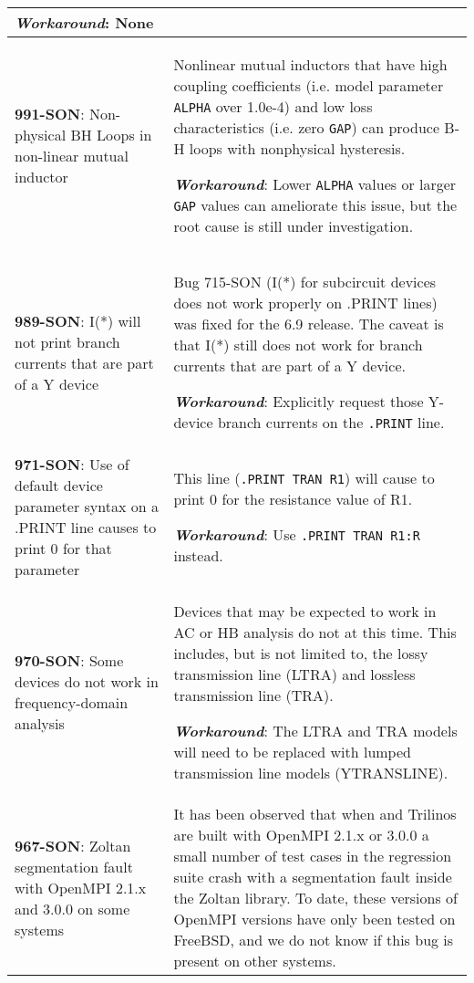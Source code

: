 {\begin{longtable}[h] {>{\raggedright\small}m{2in}|>{\raggedright\let\\\tabularnewline\small}m{3.5in}}
\textbf{\textit{Workaround}}: None
\\ \hline

\textbf{991-SON}: Non-physical BH Loops in non-linear mutual inductor &
Nonlinear mutual inductors that have high coupling coefficients (i.e. 
model parameter \texttt{ALPHA} over 1.0e-4) and low loss characteristics 
(i.e. zero \texttt{GAP}) can produce B-H loops with nonphysical hysteresis.

\textbf{\textit{Workaround}}: Lower \texttt{ALPHA} values or larger 
\texttt{GAP} values can ameliorate this issue, but the root cause is 
still under investigation. 
\\ \hline

\textbf{989-SON}: I(*) will not print branch currents that are part of a Y
device & Bug 715-SON (I(*) for subcircuit devices does not work
properly on .PRINT lines) was fixed for the \Xyce{} 6.9 release.  The
caveat is that I(*) still does not work for branch currents that are
part of a Y device.

\textbf{\textit{Workaround}}: Explicitly request those Y-device branch
currents on the \texttt{.PRINT} line.
\\ \hline

\textbf{971-SON}: Use of default device parameter syntax on a .PRINT line causes
\Xyce{} to print 0 for that parameter & This line (\texttt{.PRINT TRAN R1}) will
cause \Xyce{} to print 0 for the resistance value of R1.

\textbf{\textit{Workaround}}: Use \texttt{.PRINT TRAN R1:R} instead.
\\ \hline

\textbf{970-SON}: Some devices do not work in frequency-domain analysis &
Devices that may be expected to work in AC or HB analysis do not at
this time.  This includes, but is not limited to, the lossy
transmission line (LTRA) and lossless transmission line (TRA).

\textbf{\textit{Workaround}}: The LTRA and TRA models will need to be replaced
with lumped transmission line models (YTRANSLINE).
\\ \hline

\textbf{967-SON}: Zoltan segmentation fault with OpenMPI 2.1.x and 3.0.0 on
some systems & It has been observed that when \Xyce{} and Trilinos are
built with OpenMPI 2.1.x or 3.0.0 a small number of test cases in the
regression suite crash with a segmentation fault inside the Zoltan
library.  To date, these versions of OpenMPI versions have only been
tested on FreeBSD, and we do not know if this bug is present on other
systems.  \\ \hline


\end{longtable}}
